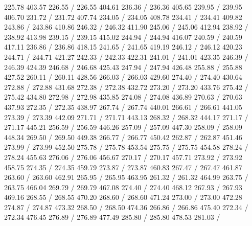 { 225.78 403.57 226.55 /
 226.55 404.61 236.36 /
 236.36 405.65 239.95 /
 239.95 406.70 231.72 /
 231.72 407.74 234.05 /
 234.05 408.78 234.41 /
 234.41 409.82 243.86 /
 243.86 410.86 246.32 /
 246.32 411.90 245.06 /
 245.06 412.94 238.92 /
 238.92 413.98 239.15 /
 239.15 415.02 244.94 /
 244.94 416.07 240.59 /
 240.59 417.11 236.86 /
 236.86 418.15 241.65 /
 241.65 419.19 246.12 /
 246.12 420.23 244.71 /
 244.71 421.27 242.33 /
 242.33 422.31 241.01 /
 241.01 423.35 246.39 /
 246.39 424.39 246.68 /
 246.68 425.43 247.94 /
 247.94 426.48 255.88 /
 255.88 427.52 260.11 /
 260.11 428.56 266.03 /
 266.03 429.60 274.40 /
 274.40 430.64 272.88 /
 272.88 431.68 272.38 /
 272.38 432.72 273.20 /
 273.20 433.76 275.42 /
 275.42 434.80 272.98 /
 272.98 435.85 274.08 /
 274.08 436.89 270.63 /
 270.63 437.93 272.35 /
 272.35 438.97 267.74 /
 267.74 440.01 266.61 /
 266.61 441.05 273.39 /
 273.39 442.09 271.71 /
 271.71 443.13 268.32 /
 268.32 444.17 271.17 /
 271.17 445.21 256.59 /
 256.59 446.26 257.09 /
 257.09 447.30 258.09 /
 258.09 448.34 269.50 /
 269.50 449.38 266.77 /
 266.77 450.42 262.87 /
 262.87 451.46 273.99 /
 273.99 452.50 275.78 /
 275.78 453.54 275.75 /
 275.75 454.58 278.24 /
 278.24 455.63 276.06 /
 276.06 456.67 270.17 /
 270.17 457.71 273.92 /
 273.92 458.75 274.35 /
 274.35 459.79 273.87 /
 273.87 460.83 267.47 /
 267.47 461.87 263.60 /
 263.60 462.91 265.95 /
 265.95 463.95 261.32 /
 261.32 464.99 263.75 /
 263.75 466.04 269.79 /
 269.79 467.08 274.40 /
 274.40 468.12 267.93 /
 267.93 469.16 268.55 /
 268.55 470.20 268.60 /
 268.60 471.24 273.00 /
 273.00 472.28 274.87 /
 274.87 473.32 268.50 /
 268.50 474.36 266.86 /
 266.86 475.40 272.34 /
 272.34 476.45 276.89 /
 276.89 477.49 285.80 /
 285.80 478.53 281.03 /
}
